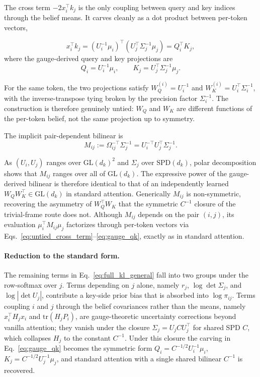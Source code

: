 \documentclass[11pt]{article}
\begin{document}
The cross term $-2x_i^\top k_j$ is the only coupling between query and key indices through the belief means. It carves cleanly as a dot product between per-token vectors,

\begin{equation}
x_i^\top k_j = (U_i^{-1}\mu_i)^\top (U_j^\top \Sigma_j^{-1}\mu_j) = Q_i^\top K_j,
\label{eq:untied_cross_term}
\end{equation}
where the gauge-derived query and key projections are
\begin{equation}
\boxed{Q_i = U_i^{-1}\mu_i, \qquad K_j = U_j^\top \Sigma_j^{-1}\mu_j.}
\label{eq:gauge_qk}
\end{equation}

For the same token, the two projections satisfy $W_Q^{(i)} = U_i^{-1}$ and $W_K^{(i)} = U_i^\top \Sigma_i^{-1}$, with the inverse-transpose tying broken by the precision factor $\Sigma_i^{-1}$. The construction is therefore genuinely untied: $W_Q$ and $W_K$ are different functions of the per-token belief, not the same projection up to symmetry.

The implicit pair-dependent bilinear is
\begin{equation}
M_{ij} := \Omega_{ij}^{-\top}\Sigma_j^{-1} = U_i^{-\top} U_j^\top \Sigma_j^{-1}.
\label{eq:gauge_bilinear}
\end{equation}

As $(U_i, U_j)$ ranges over $\mathrm{GL}(d_k)^2$ and $\Sigma_j$ over $\mathrm{SPD}(d_k)$, polar decomposition shows that $M_{ij}$ ranges over all of $\mathrm{GL}(d_k)$. The expressive power of the gauge-derived bilinear is therefore identical to that of an independently learned $W_Q W_K^\top \in \mathrm{GL}(d_k)$ in standard attention. Generically $M_{ij}$ is non-symmetric, recovering the asymmetry of $W_Q^\top W_K$ that the symmetric $C^{-1}$ closure of the trivial-frame route does not. Although $M_{ij}$ depends on the pair $(i,j)$, its evaluation $\mu_i^\top M_{ij}\mu_j$ factorizes through per-token vectors via Eqs.~\eqref{eq:untied_cross_term}--\eqref{eq:gauge_qk}, exactly as in standard attention.

\paragraph{Reduction to the standard form.}
The remaining terms in Eq.~\eqref{eq:full_kl_general} fall into two groups under the row-softmax over $j$. Terms depending on $j$ alone, namely $r_j$, $\log\det\Sigma_j$, and $\log|\det U_j|$, contribute a key-side prior bias that is absorbed into $\log\pi_{ij}$. Terms coupling $i$ and $j$ through the belief covariances rather than the means, namely $x_i^\top H_j x_i$ and $\mathrm{tr}(H_j P_i)$, are gauge-theoretic uncertainty corrections beyond vanilla attention; they vanish under the closure $\Sigma_j = U_j C U_j^\top$ for shared SPD $C$, which collapses $H_j$ to the constant $C^{-1}$. Under this closure the carving in Eq.~\eqref{eq:gauge_qk} becomes the symmetric form $Q_i = C^{-1/2}U_i^{-1}\mu_i$, $K_j = C^{-1/2}U_j^{-1}\mu_j$, and standard attention with a single shared bilinear $C^{-1}$ is recovered.
\end{document}
